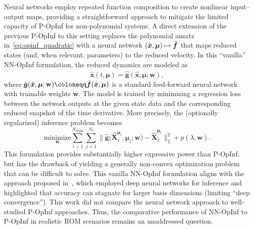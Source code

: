 \documentclass[3p,computermodern,11pt]{elsarticle}
\numberwithin{equation}{section}
\newcommand{\reducedState}{\hat{\state}}
\newcommand{\reducedSnapshotsLhs}{\dot{\hat{\snapshotsState}}}
\newcommand{\penaltyFunction}{p}
\newcommand{\penaltyParameter}{\lambda}
\newcommand{\reducedVelocityNN}{\hat{\boldsymbol g}}
\newcommand{\weights}{\mathbf{w}}
\newcommand{\nt}{N_t}
\newcommand{\snapshotsState}{\mathbf{X}}
\newcommand{\reducedSnapshotsState}{\hat{\mathbf{X}}}
\newcommand{\reducedVelocity}{\skew{4}\hat{\velocity}}
\newcommand{\state}{\boldsymbol x}
\newcommand{\velocity}{\boldsymbol f}
\newcommand{\params}{\boldsymbol \mu}
\newcommand{\nTrain}{N_{\text{train}}}
\begin{document}
Neural networks employ repeated function composition to create nonlinear input--output maps, providing a straightforward approach to mitigate the limited capacity of P-OpInf for non-polynomial systems. A direct extension of the previous P-OpInf to this setting replaces the polynomial ansatz in~\eqref{eq:opinf_quadratic} with a neural network $(\reducedState,\params)\mapsto\reducedVelocity$ that maps reduced states (and, when relevant, parameters) to the reduced velocity. In this ``vanilla'' NN-OpInf formulation, the reduced dynamics are modeled as
\begin{equation}\label{eq:vanilla_nn_opinf}
\dot\reducedState(t,\params) = \reducedVelocityNN(\reducedState,\params;\weights),
\end{equation}
where $\reducedVelocityNN(\reducedState,\params;\weights)\coloneqq\reducedVelocity(\reducedState,\params)$ is a standard feed-forward neural network with trainable weights $\weights$. The model is trained by minimizing a regression loss between the network outputs 
at the given state data and the corresponding reduced snapshot 
of the time derivative. More precisely, the (optionally regularized) inference problem becomes
\begin{equation}\label{eq:vanilla_nn_opinf_opt}
\underset{\weights}{\mathrm{minimize}} \sum_{i=1}^{\nTrain}\sum_{j=1}^{\nt} \Big\| \reducedVelocityNN\big(\reducedSnapshotsState^{\params_i}_j,\params_i;\weights\big) - \reducedSnapshotsLhs^{\params_i}_j \Big\|_2^2 + \penaltyFunction(\penaltyParameter,\weights).
\end{equation}
This formulation provides substantially higher expressive power than P-OpInf, but has the drawback of yielding a generally non-convex optimization problem that can be difficult to solve. This vanilla NN-OpInf formulation aligns with the approach proposed in~\cite{GaWaZh20}, which employed deep neural networks for inference and 
highlighted that accuracy can stagnate for larger basis dimensions (limiting ``deep convergence'').  This  work did not compare the neural network approach to well-studied P-OpInf approaches. Thus, the comparative performance of NN-OpInf to P-OpInf in realistic ROM scenarios remains an unaddressed question.
\end{document}
